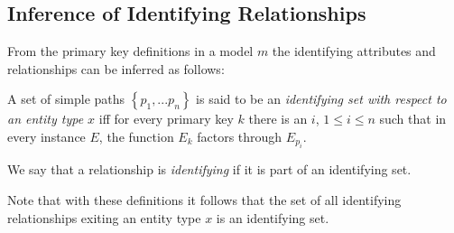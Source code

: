 \documentclass[10pt,a4paper]{article}
\newcommand{\set}[1]{\left\{#1\right\}}
\newcommand{\genericmodel}{\mathcal{M}}
\renewcommand{\genericmodel}{{m}}
\newcommand{\term}[1]{\textit{{#1}}}
\begin{document}
\subsection*{Inference of Identifying Relationships}
From the primary key definitions in a model $\genericmodel$ the identifying attributes and relationships can be inferred as follows:

\begin{definition}
A set of simple paths $\set{p_1,...p_n}$ is said to be an 
\term{identifying set with respect to an entity type $x$} iff for every primary key $k$
 there is an $i$, $1 \leq i \leq n$ such that in every 
instance $E$, the function $E_k$ factors through $E_{p_i}$. 
\end{definition}
We say that a relationship is \textit{identifying} if it is part of an identifying set. 

Note that with these definitions it follows that the set of all identifying relationships exiting an entity type $x$ is an identifying set.
\end{document}
